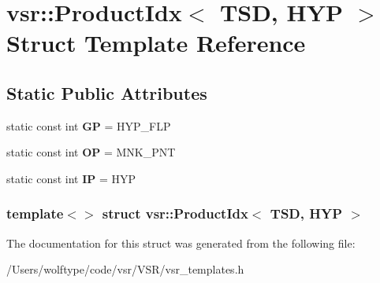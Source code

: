 \hypertarget{structvsr_1_1_product_idx_3_01_t_s_d_00_01_h_y_p_01_4}{\section{vsr\-:\-:Product\-Idx$<$ T\-S\-D, H\-Y\-P $>$ Struct Template Reference}
\label{structvsr_1_1_product_idx_3_01_t_s_d_00_01_h_y_p_01_4}
}
\subsection*{Static Public Attributes}
\begin{DoxyCompactItemize}
\item 
\hypertarget{structvsr_1_1_product_idx_3_01_t_s_d_00_01_h_y_p_01_4_afb7f73c9bc217c774990e6ebe7a65cbb}{static const int {\bfseries G\-P} = H\-Y\-P\-\_\-\-F\-L\-P}\label{structvsr_1_1_product_idx_3_01_t_s_d_00_01_h_y_p_01_4_afb7f73c9bc217c774990e6ebe7a65cbb}

\item 
\hypertarget{structvsr_1_1_product_idx_3_01_t_s_d_00_01_h_y_p_01_4_a7e85fa4823e0c802456b2791ab688590}{static const int {\bfseries O\-P} = M\-N\-K\-\_\-\-P\-N\-T}\label{structvsr_1_1_product_idx_3_01_t_s_d_00_01_h_y_p_01_4_a7e85fa4823e0c802456b2791ab688590}

\item 
\hypertarget{structvsr_1_1_product_idx_3_01_t_s_d_00_01_h_y_p_01_4_a95cdbe0779977ca1d4fc6dda9b64a763}{static const int {\bfseries I\-P} = H\-Y\-P}\label{structvsr_1_1_product_idx_3_01_t_s_d_00_01_h_y_p_01_4_a95cdbe0779977ca1d4fc6dda9b64a763}

\end{DoxyCompactItemize}
\subsubsection*{template$<$$>$ struct vsr\-::\-Product\-Idx$<$ T\-S\-D, H\-Y\-P $>$}



The documentation for this struct was generated from the following file\-:\begin{DoxyCompactItemize}
\item 
/\-Users/wolftype/code/vsr/\-V\-S\-R/vsr\-\_\-templates.\-h\end{DoxyCompactItemize}

